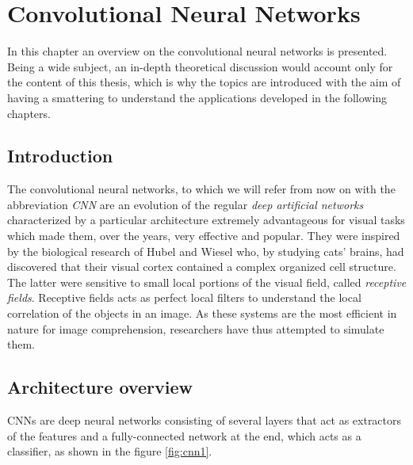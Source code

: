 


\chapter{Convolutional Neural Networks} %
\label{Chapter3}
\def \teoria {Figures/teoria}
\def \path	 {Figures/C3}
In this chapter an overview on the convolutional neural networks is presented. Being a wide subject, an in-depth theoretical discussion would account only for the content of this thesis, which is why the topics are introduced with the aim of having a smattering to understand the applications developed in the following chapters. 

\section{Introduction}

The convolutional neural networks, to which we will refer from now on with the abbreviation \emph{CNN} are an evolution of the regular \emph{deep artificial networks} characterized by a particular architecture extremely advantageous for visual tasks which made them, over the years, very effective and popular. They were inspired by the biological research of Hubel and Wiesel who, by studying cats' brains, had discovered that their visual cortex contained a complex organized cell structure. The latter were sensitive to small local portions of the visual field, called \emph{receptive fields}. Receptive fields acts as perfect local filters to understand the local correlation of the objects in an image. As these systems are the most efficient in nature for image comprehension, researchers have thus attempted to simulate them. 


\section{Architecture overview}
CNNs are deep neural networks consisting of several layers that act as extractors of the features and a fully-connected network at the end, which acts as a classifier, as shown in the figure \ref{fig:cnn1}. 

